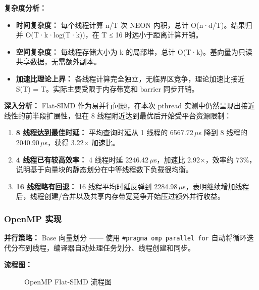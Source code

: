 \documentclass[a4paper]{article}
\begin{document}
\textbf{复杂度分析：}

\begin{itemize}
\item \textbf{时间复杂度：} 每个线程计算 n/T 次 NEON 内积，总计 O(n·d/T)。结果归并 O(T·k·log(T·k))，在 T ≤ 16 时远小于距离计算开销。
\item \textbf{空间复杂度：} 每线程存储大小为 k 的局部堆，总计 O(T·k)。基向量为只读共享数据，无需额外副本。
\item \textbf{加速比理论上界：} 各线程计算完全独立，无临界区竞争，理论加速比接近 S(T) = T。实际主要受限于内存带宽和 barrier 同步开销。
\end{itemize}

\textbf{深入分析：} Flat-SIMD 作为易并行问题，在本次 pthread 实测中仍然呈现出接近线性的前半段扩展性，但在 8 线程附近达到最优后开始受平台资源限制：

\begin{enumerate}
\item \textbf{8 线程达到最佳时延：} 平均查询时延从 1 线程的 6567.72\,$\mu$s 降到 8 线程的 2040.90\,$\mu$s，获得 3.22× 加速比。
\item \textbf{4 线程已有较高效率：} 4 线程时延 2246.42\,$\mu$s，加速比 2.92×，效率约 73\%，说明基于向量块的静态划分在中等线程数下负载很均衡。
\item \textbf{16 线程略有回退：} 16 线程平均时延反弹到 2284.98\,$\mu$s，表明继续增加线程后，线程创建/合并以及共享内存带宽竞争开始压过额外并行收益。
\end{enumerate}

\subsubsection{OpenMP 实现}

\textbf{并行策略：} Base 向量划分 —— 使用 \texttt{\#pragma omp parallel for} 自动将循环迭代分布到线程，编译器自动处理任务划分、线程创建和同步。

\textbf{流程图：}

\begin{figure}[htbp]
\centering
{}
\caption{OpenMP Flat-SIMD 流程图}
\end{figure}
\end{document}
